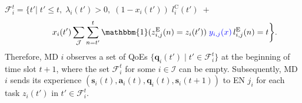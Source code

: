\documentclass[10pt, journal,letterpaper]{IEEEtran}
\begin{document}
$\mathcal{F}_i^t =\bigg \{ t' \bigg|\; t' \leq t,\; \lambda_i(t')>0, \; (1 - x_i(t')) \; l_i^{\text{C}}(t') \; + $ \vspace{-3mm}
\begin{equation}
	\hspace{10mm} x_i(t')\sum\limits_{\mathcal{J}} \sum\limits_{n= t'}^{t}\mathbbm{1}(z_{i,j}^{\text{E}}(n)=z_i(t'))  \; \textcolor{blue}{y_{i,j}(x)} \, l_{i,j}^{\text{E}}(n) = t \bigg\}.
	\label{27}  
	\nonumber
\end{equation}
Therefore, MD $i$ observes a set of QoEs $\{\boldsymbol{q}_i(t') \mid t' \in \mathcal{F}_i^t\}$ at the beginning of time slot $t+1$, where the set $\mathcal{F}_i^t$ for some $i \in \mathcal{I}$ can be empty. Subsequently, MD $i$ sends its experience $(\boldsymbol{s}_i(t), \boldsymbol{a}_i(t), \boldsymbol{q}_i(t), \boldsymbol{s}_i(t+1))$ to EN $j_i$ for each task $z_i(t')$ in $t' \in \mathcal{F}_i^t$.
\end{document}
